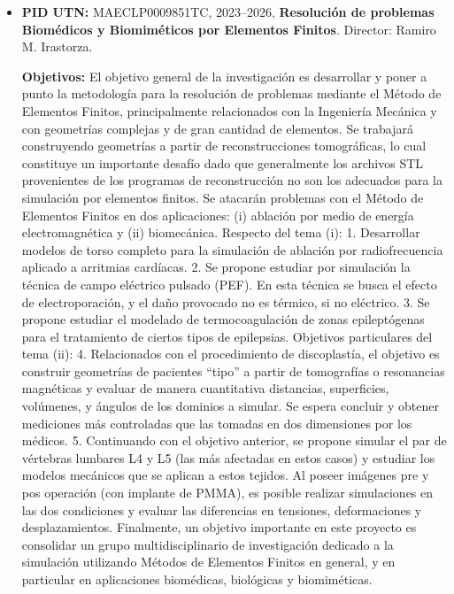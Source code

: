\documentclass[a4paper,11pt,twoside,final,titlepage,onecolumn,openright]{report}
\begin{document}
\begin{itemize}
\item {\bf PID UTN:} MAECLP0009851TC, 2023--2026, {\bf Resolución de problemas Biomédicos y Biomiméticos por Elementos Finitos}. Director: Ramiro M. Irastorza.
 
{\bf Objetivos:} El objetivo general de la investigación es desarrollar y poner a punto la metodología para la resolución de problemas mediante el Método de Elementos Finitos, principalmente relacionados con la Ingeniería Mecánica y con geometrías complejas y de gran cantidad de elementos. Se trabajará construyendo geometrías a partir de reconstrucciones tomográficas, lo cual constituye un importante desafío dado que generalmente los archivos STL provenientes de los programas de reconstrucción no son los adecuados para la simulación por elementos finitos. Se atacarán problemas con el Método de Elementos Finitos en dos aplicaciones: (i) ablación por medio de energía electromagnética y (ii) biomecánica. Respecto del tema (i): 1. Desarrollar modelos de torso completo para la simulación de ablación por radiofrecuencia aplicado a arritmias cardíacas. 2. Se propone estudiar por simulación la técnica de campo eléctrico pulsado (PEF). En esta técnica se busca el efecto de electroporación, y el daño provocado no es térmico, si no eléctrico. 3. Se propone estudiar el modelado de termocoagulación de zonas epileptógenas para el tratamiento de ciertos tipos de epilepsias. Objetivos particulares del tema (ii): 4. Relacionados con el procedimiento de discoplastía, el objetivo es construir geometrías de pacientes “tipo” a partir de tomografías o resonancias magnéticas y evaluar de manera cuantitativa distancias, superficies, volúmenes, y ángulos de los dominios a simular. Se espera concluir y obtener mediciones más controladas que las tomadas en dos dimensiones por los médicos. 5. Continuando con el objetivo anterior, se propone simular el par de vértebras lumbares L4 y L5 (las más afectadas en estos casos) y estudiar los modelos mecánicos que se aplican a estos tejidos. Al poseer imágenes pre y pos operación (con implante de PMMA), es posible realizar simulaciones en las dos condiciones y evaluar las diferencias en tensiones, deformaciones y desplazamientos. Finalmente, un objetivo importante en este proyecto es consolidar un grupo multidisciplinario de investigación dedicado a la simulación utilizando Métodos de Elementos Finitos en general, y en particular en aplicaciones biomédicas, biológicas y biomiméticas. 


\end{itemize}
\end{document}
